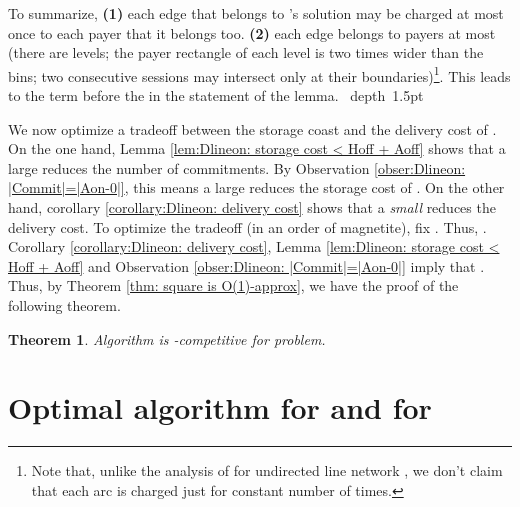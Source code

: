 \documentclass[11pt]{article}
\newtheorem{theorem}{Theorem}[section]
\def\blackslug{\hbox{\hskip 1pt \vrule width 4pt height 8pt
    depth 1.5pt \hskip 1pt}}
\def\QED{\quad\blackslug\lower 8.5pt\null\par}
\begin{document}
To summarize,
{\bf (1)} each edge that belongs to 's solution may be charged at most once to each payer that it belongs too.
{\bf (2)} each edge belongs to  payers at most (there are  levels;
the payer rectangle of each level is two times wider than the bins; two consecutive sessions may intersect only at their boundaries)\footnote{
Note that, unlike the analysis of  for undirected line network \cite{KK2014,KK2014TR},
we don't claim that each arc is charged just for constant number of times.
}.
This leads to the term  before the  in the statement of the lemma.
\QED




We now optimize a tradeoff between the storage coast and the delivery cost of .
On the one hand, Lemma \ref{lem:Dlineon: storage cost < Hoff + Aoff} shows that a large 
reduces the number of commitments.
By Observation \ref{obser:Dlineon: |Commit|=|Aon-0|}, this means a large  reduces the storage cost of .
On the other hand, corollary \ref{corollary:Dlineon: delivery cost} shows that a {\em small}  reduces the delivery cost.
To optimize the tradeoff (in an order of magnetite), fix .
Thus, .
Corollary \ref{corollary:Dlineon: delivery cost},
Lemma \ref{lem:Dlineon: storage cost < Hoff + Aoff} and Observation \ref{obser:Dlineon: |Commit|=|Aon-0|}
imply that .
Thus, by Theorem \ref{thm: square is O(1)-approx}, we
have the proof of the following theorem.

\begin{theorem}
Algorithm
 is -competitive for
 problem.
\label{thm: Dlineon is frac(log n)(log log n) competitive}
\end{theorem}



\vspace{-0.3cm}
\section{Optimal algorithm for  and for }
\label{subsec: optRSA}


\vspace{-0.2cm}
\end{document}
